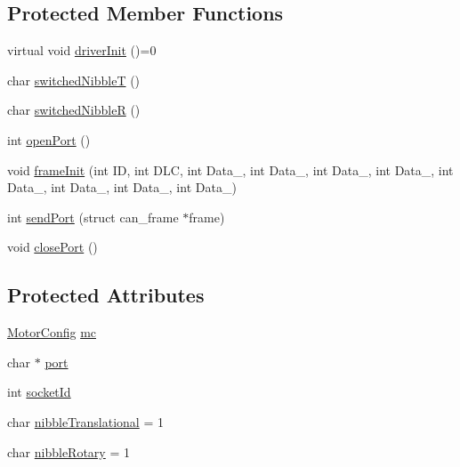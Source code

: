 \subsection*{Protected Member Functions}
\begin{DoxyCompactItemize}
\item 
virtual void \hyperlink{class_motor_communicator_interface_a8ba57825f67ba4e1230c73fec5882ec5}{driver\+Init} ()=0
\item 
char \hyperlink{class_motor_communicator_interface_a785b78dce2453ed4dde8c5d16705cdb0}{switched\+NibbleT} ()
\item 
char \hyperlink{class_motor_communicator_interface_a52c053b2fdb278bf07a227322e92f0fc}{switched\+NibbleR} ()
\item 
int \hyperlink{class_motor_communicator_interface_a9b611145c47f1d8842eb9411d9e0e95a}{open\+Port} ()
\item 
void \hyperlink{class_motor_communicator_interface_a833096f7dfe3a034f30f53fb6f380f3b}{frame\+Init} (int ID, int D\+LC, int Data\+\_, int Data\+\_, int Data\+\_, int Data\+\_, int Data\+\_, int Data\+\_, int Data\+\_, int Data\+\_)
\item 
int \hyperlink{class_motor_communicator_interface_a62511203d5a487dc7148c8f083d89d12}{send\+Port} (struct can\+\_\+frame $\ast$frame)
\item 
void \hyperlink{class_motor_communicator_interface_aa761210caa851871c73732955e1eadba}{close\+Port} ()
\end{DoxyCompactItemize}
\subsection*{Protected Attributes}
\begin{DoxyCompactItemize}
\item 
\hyperlink{class_motor_config}{Motor\+Config} \hyperlink{class_motor_communicator_interface_aae1e504fe7cce7e933b77d8e31a96878}{mc}
\item 
char $\ast$ \hyperlink{class_motor_communicator_interface_adde2a840f8e9cd2e43b34af2bf8c3719}{port}
\item 
int \hyperlink{class_motor_communicator_interface_ad4d2f463fa6182b86bee4852dcee3d3a}{socket\+Id}
\item 
char \hyperlink{class_motor_communicator_interface_ae3010f217b379f0f62ebd5fee8387f21}{nibble\+Translational} = 1
\item 
char \hyperlink{class_motor_communicator_interface_af57ae9b19b30f4e7fc07545629117ad9}{nibble\+Rotary} = 1
\end{DoxyCompactItemize}


